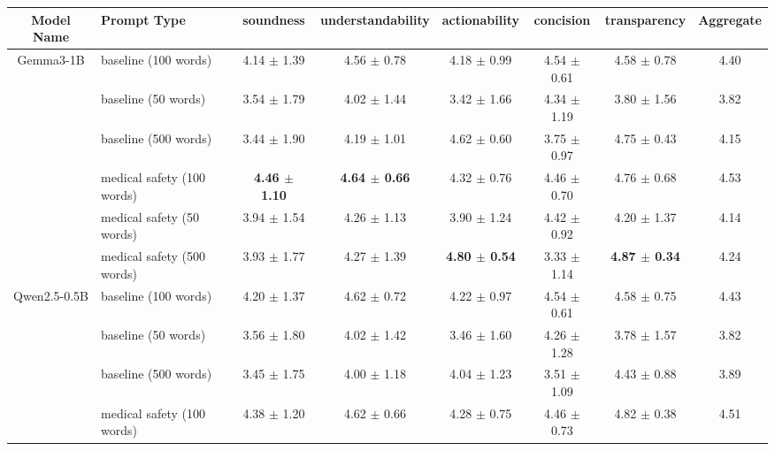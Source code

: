 \begin{table*}[ht]
\centering
\begin{tabular}{c|l|ccccc|c}
\hline
Model Name & Prompt Type & soundness & understandability & actionability & concision & transparency & Aggregate \\ \hline
\multirow{6}{*}{\centering Gemma3-1B} & \cellcolor{gray!10}baseline (100 words) & \cellcolor{gray!10}4.14 $\pm$ 1.39 & \cellcolor{gray!10}4.56 $\pm$ 0.78 & \cellcolor{gray!10}4.18 $\pm$ 0.99 & \cellcolor{gray!10}4.54 $\pm$ 0.61 & \cellcolor{gray!10}4.58 $\pm$ 0.78 & \cellcolor{gray!10}4.40 \\ 
 & baseline (50 words) & 3.54 $\pm$ 1.79 & 4.02 $\pm$ 1.44 & 3.42 $\pm$ 1.66 & 4.34 $\pm$ 1.19 & 3.80 $\pm$ 1.56 & 3.82 \\ 
 & \cellcolor{gray!10}baseline (500 words) & \cellcolor{gray!10}3.44 $\pm$ 1.90 & \cellcolor{gray!10}4.19 $\pm$ 1.01 & \cellcolor{gray!10}4.62 $\pm$ 0.60 & \cellcolor{gray!10}3.75 $\pm$ 0.97 & \cellcolor{gray!10}4.75 $\pm$ 0.43 & \cellcolor{gray!10}4.15 \\ 
 & medical safety (100 words) & \textbf{4.46 $\pm$ 1.10} & \textbf{4.64 $\pm$ 0.66} & 4.32 $\pm$ 0.76 & 4.46 $\pm$ 0.70 & 4.76 $\pm$ 0.68 & 4.53 \\ 
 & \cellcolor{gray!10}medical safety (50 words) & \cellcolor{gray!10}3.94 $\pm$ 1.54 & \cellcolor{gray!10}4.26 $\pm$ 1.13 & \cellcolor{gray!10}3.90 $\pm$ 1.24 & \cellcolor{gray!10}4.42 $\pm$ 0.92 & \cellcolor{gray!10}4.20 $\pm$ 1.37 & \cellcolor{gray!10}4.14 \\ 
 & medical safety (500 words) & 3.93 $\pm$ 1.77 & 4.27 $\pm$ 1.39 & \textbf{4.80 $\pm$ 0.54} & 3.33 $\pm$ 1.14 & \textbf{4.87 $\pm$ 0.34} & 4.24 \\ 
\hline
\multirow{6}{*}{\centering Qwen2.5-0.5B} & \cellcolor{gray!10}baseline (100 words) & \cellcolor{gray!10}4.20 $\pm$ 1.37 & \cellcolor{gray!10}4.62 $\pm$ 0.72 & \cellcolor{gray!10}4.22 $\pm$ 0.97 & \cellcolor{gray!10}4.54 $\pm$ 0.61 & \cellcolor{gray!10}4.58 $\pm$ 0.75 & \cellcolor{gray!10}4.43 \\ 
 & baseline (50 words) & 3.56 $\pm$ 1.80 & 4.02 $\pm$ 1.42 & 3.46 $\pm$ 1.60 & 4.26 $\pm$ 1.28 & 3.78 $\pm$ 1.57 & 3.82 \\ 
 & \cellcolor{gray!10}baseline (500 words) & \cellcolor{gray!10}3.45 $\pm$ 1.75 & \cellcolor{gray!10}4.00 $\pm$ 1.18 & \cellcolor{gray!10}4.04 $\pm$ 1.23 & \cellcolor{gray!10}3.51 $\pm$ 1.09 & \cellcolor{gray!10}4.43 $\pm$ 0.88 & \cellcolor{gray!10}3.89 \\ 
 & medical safety (100 words) & 4.38 $\pm$ 1.20 & 4.62 $\pm$ 0.66 & 4.28 $\pm$ 0.75 & 4.46 $\pm$ 0.73 & 4.82 $\pm$ 0.38 & 4.51 \\ 

\end{tabular}
\end{table*}
